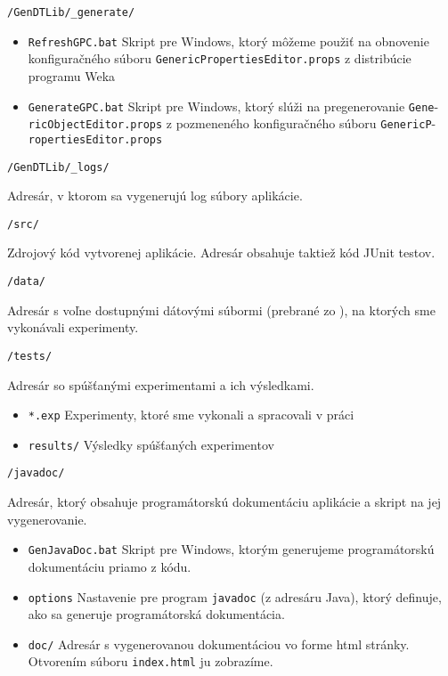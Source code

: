 {\LARGE\verb|/GenDTLib/_generate/|}

{
\begin{itemize}
\item \verb|RefreshGPC.bat| Skript pre Windows, ktorý môžeme použiť na obnovenie konfiguračného súboru \verb|GenericPropertiesEditor.props| z distribúcie programu Weka
\item \verb|GenerateGPC.bat| Skript pre Windows, ktorý slúži na pregenerovanie \verb|Gene|- \verb|ricObjectEditor.props| z pozmeneného konfiguračného súboru \verb|GenericP|- \verb|ropertiesEditor.props|
\end{itemize}
}

{\LARGE\verb|/GenDTLib/_logs/|}

{
Adresár, v ktorom sa vygenerujú log súbory aplikácie.
}

{\LARGE\verb|/src/|}

{
Zdrojový kód vytvorenej aplikácie. Adresár obsahuje taktiež kód JUnit testov.
}

{\LARGE\verb|/data/|} 

{
Adresár s voľne dostupnými dátovými súbormi (prebrané zo \cite{online-uci}), na ktorých sme vykonávali experimenty.
}

{\LARGE\verb|/tests/|}

{
Adresár so spúšťanými experimentami a ich výsledkami.
\begin{itemize}
\item \verb|*.exp| Experimenty, ktoré sme vykonali a spracovali v práci
\item \verb|results/| Výsledky spúšťaných experimentov
\end{itemize}
}

{\LARGE\verb|/javadoc/|}

Adresár, ktorý obsahuje programátorskú dokumentáciu aplikácie a skript na jej vygenerovanie. 
{
\begin{itemize}
\item \verb|GenJavaDoc.bat| Skript pre Windows, ktorým generujeme programátorskú dokumentáciu priamo z kódu.
\item \verb|options| Nastavenie pre program \verb|javadoc| (z adresáru Java), ktorý definuje, ako sa generuje programátorská dokumentácia.
\item \verb|doc/| Adresár s vygenerovanou dokumentáciou vo forme html stránky. Otvorením súboru \verb|index.html| ju zobrazíme.
\end{itemize}
}



